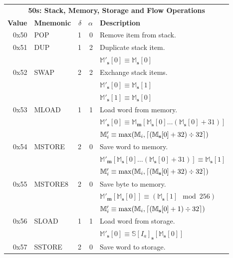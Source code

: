 \documentclass[9pt,oneside]{amsart}
\DeclarePairedDelimiter{\ceil}{\lceil}{\rceil}
\begin{document}
\begin{tabular*}{\columnwidth}[h]{rlrrl}
\toprule
\multicolumn{5}{c}{\textbf{50s: Stack, Memory, Storage and Flow Operations}} \vspace{5pt} \\
\textbf{Value} & \textbf{Mnemonic} & $\delta$ & $\alpha$ & \textbf{Description} \vspace{5pt} \\
0x50 & {\small POP} & 1 & 0 & Remove item from stack. \\
\midrule
0x51 & {\small DUP} & 1 & 2 & Duplicate stack item. \\
&&&& $\mathbb{M}'_\mathbf{s}[0] \equiv \mathbb{M}_\mathbf{s}[0]$ \\
\midrule
0x52 & {\small SWAP} & 2 & 2 & Exchange stack items. \\
&&&& $\mathbb{M}'_\mathbf{s}[0] \equiv \mathbb{M}_\mathbf{s}[1]$ \\
&&&& $\mathbb{M}'_\mathbf{s}[1] \equiv \mathbb{M}_\mathbf{s}[0]$ \\
\midrule
0x53 & {\small MLOAD} & 1 & 1 & Load word from memory. \\
&&&& $\mathbb{M}'_\mathbf{s}[0] \equiv \mathbb{M}_\mathbf{m}[\mathbb{M}_\mathbf{s}[0] \dots (\mathbb{M}_\mathbf{s}[0] + 31) ]$ \\
&&&& $\mathbb{M}'_i \equiv \max(\mathbb{M}_i, \ceil{ (\mathbb{M}_\mathbf{s}[0] + 32) \div 32 })$ \\
\midrule
0x54 & {\small MSTORE} & 2 & 0 & Save word to memory. \\
&&&& $\mathbb{M}'_\mathbf{m}[ \mathbb{M}_\mathbf{s}[0] \dots (\mathbb{M}_\mathbf{s}[0] + 31) ] \equiv \mathbb{M}_\mathbf{s}[1]$ \\
&&&& $\mathbb{M}'_i \equiv \max(\mathbb{M}_i, \ceil{ (\mathbb{M}_\mathbf{s}[0] + 32) \div 32 })$ \\
\midrule
0x55 & {\small MSTORE8} & 2 & 0 & Save byte to memory. \\
&&&& $\mathbb{M}'_\mathbf{m}[ \mathbb{M}_\mathbf{s}[0] ] \equiv (\mathbb{M}_\mathbf{s}[1] \mod 256) $ \\
&&&& $\mathbb{M}'_i \equiv \max(\mathbb{M}_i, \ceil{ (\mathbb{M}_\mathbf{s}[0] + 1) \div 32 })$ \\
\midrule
0x56 & {\small SLOAD} & 1 & 1 & Load word from storage. \\
&&&& $\mathbb{M}'_\mathbf{s}[0] \equiv \mathbb{S}[I_a]_\mathbf{s}[\mathbb{M}_\mathbf{s}[0]]$ \\
\midrule
0x57 & {\small SSTORE} & 2 & 0 & Save word to storage. \\

\end{tabular*}
\end{document}
